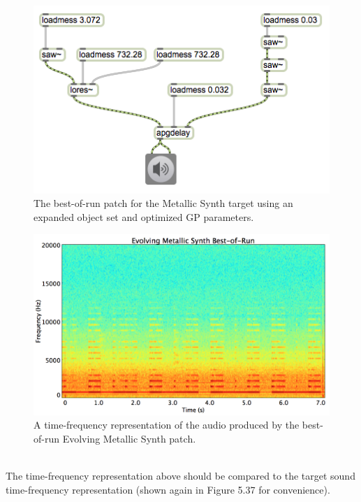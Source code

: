 \documentclass[a4paper,12pt]{report} 	%
\numberwithin{figure}{chapter}
\numberwithin{table}{chapter}
\numberwithin{equation}{chapter}
\begin{document}
\begin{flushleft}
\begin{figure}[h!]
\begin{center}
\includegraphics[width=\linewidth]{MetallicSynth_Best}
\caption[Metallic Synth Best-of-Run Patch]{The best-of-run patch for the Metallic Synth target using an expanded object set and optimized GP parameters.}
\end{center}
\end{figure}
\begin{figure}[h!]
\begin{center}
\includegraphics[scale=0.35,width=\linewidth]{EvolvingMetallicSynthBestOfRun}
\caption[Best-of-Run Evolving Metallic Synth Time-Frequency Representation]{A time-frequency representation of the audio produced by the best-of-run Evolving Metallic Synth patch.}
\end{center}
\end{figure}
\\
The time-frequency representation above should be compared to the target sound time-frequency representation (shown again in Figure 5.37 for convenience).

\end{flushleft}
\end{document}
